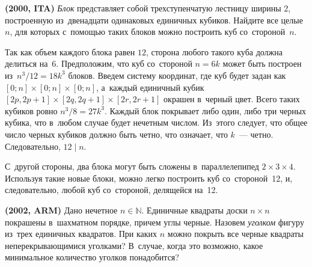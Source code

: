 \begin{problems}

\item\textbf{(2000, ITA)}
\emph{Блок} представляет собой трехступенчатую лестницу ширины 2, построенную
из~двенадцати одинаковых единичных кубиков.
Найдите все целые $n$, для которых с~помощью таких блоков можно построить куб
со~стороной~$n$.

\end{problems}

\ifincludesolutions
Так как объем каждого блока равен $12$, сторона любого такого куба должна
делиться на~$6$.
Предположим, что куб со~стороной $n = 6 k$ может быть построен
из~$n^3 / 12 = 18 k^3$ блоков.
Введем систему координат, где куб будет задан как
$[0; n] \times [0; n] \times [0; n]$,
а~каждый единичный кубик
$[2 p, 2 p + 1] \times[2 q, 2 q + 1] \times[2 r, 2 r + 1]$ окрашен
в~черный цвет.
Всего таких кубиков ровно $n^3 / 8 = 27 k^3$.
Каждый блок покрывает либо один, либо три черных кубика, что в~любом случае
будет нечетным числом.
Из~этого следует, что общее число черных кубиков должно быть четно, что
означает, что $k$~--- четно.
Следовательно, $12 \mid n$.
\par
С~другой стороны, два блока могут быть сложены в~параллелепипед
$2 \times 3 \times 4$.
Используя такие новые блоки, можно легко построить куб со~стороной~12, и,
следовательно, любой куб со~стороной, делящейся на~12.
\fi %

\begin{problems}

\item\textbf{(2002, ARM)}%
Дано нечетное $n \in \mathbb{N}$.
Единичные квадраты доски $n \times n$ покрашены в~шахматном порядке, причем
углы черные.
Назовем \emph{уголком} фигуру
из~трех единичных квадратов.
При каких $n$ можно покрыть все черные квадраты неперекрывающимися уголками?
В~случае, когда это возможно, какое минимальное количество уголков понадобится?

\end{problems}

